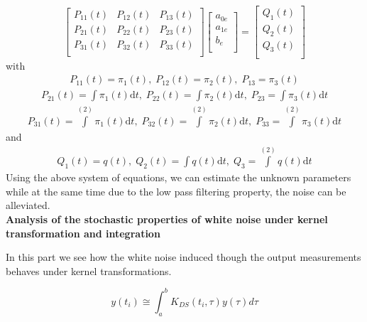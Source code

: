 \documentclass{article}
\begin{document}
\begin{equation}
\begin{bmatrix}
P_{11}(t) & P_{12}(t) & P_{13}(t) \\
P_{21}(t) & P_{22}(t) & P_{23}(t) \\
P_{31}(t) & P_{32}(t) & P_{33}(t) \\
\end{bmatrix}
\begin{bmatrix}
a_{0e} \\
a_{1e} \\
b_{e} \\
\end{bmatrix}
= 
\begin{bmatrix}
Q_{1}(t) \\
Q_{2}(t) \\
Q_{3}(t) \\
\end{bmatrix}
\end{equation}
with 
\begin{align*}
P_{11}(t) = \pi_{1}(t), \; P_{12}(t) = \pi_{2}(t), \; P_{13} = \pi_{3}(t)
\end{align*}
\begin{align*}
P_{21}(t) = \int \pi_{1}(t) \mathrm{d}t, \; P_{22}(t) = \int \pi_{2}(t) \mathrm{d}t, \; P_{23} = \int \pi_{3}(t) \mathrm{d}t
\end{align*}
\begin{align*}
P_{31}(t) = \int\limits^{(2)} \pi_{1}(t) \mathrm{d}t, \; P_{32}(t) = \int\limits^{(2)} \pi_{2}(t) \mathrm{d}t, \; P_{33} = \int\limits^{(2)} \pi_{3}(t)\mathrm{d}t
\end{align*}
and
\begin{align*}
Q_{1}(t) = q(t), \; Q_{2}(t) = \int q(t) \mathrm{d}t, \; Q_{3} = \int\limits^{(2)} q(t) \mathrm{d}t
\end{align*}
Using the above system of equations, we can estimate the unknown parameters while at the same time due to the low pass filtering property, the noise can be alleviated.\\
\textbf{Analysis of the stochastic properties of white noise under kernel transformation and integration}

In this part we see how the white noise induced though the output measurements behaves under kernel transformations.

\begin{equation}
	y(t_i) \cong \int_a^b K_{DS}(t_i,\tau) y(\tau)d\tau
\end{equation}
\end{document}
